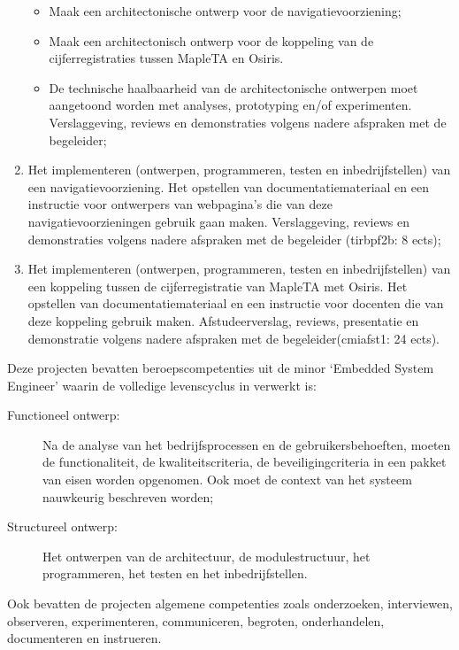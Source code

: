 \begin{enumerate}
\begin{itemize}
			\item Maak een architectonische ontwerp voor de navigatievoorziening;
			\item Maak een architectonisch ontwerp voor de koppeling van de cijferregistraties tussen MapleTA en Osiris.
			\item De technische haalbaarheid van de architectonische ontwerpen moet aangetoond worden met analyses, prototyping en/of experimenten. Verslaggeving, reviews en demonstraties volgens nadere afspraken met de begeleider;
		\end{itemize}
	\item Het implementeren (ontwerpen, programmeren, testen en inbedrijfstellen) van een navigatievoorziening. Het opstellen van documentatiemateriaal en een instructie voor ontwerpers van webpagina’s die van deze navigatievoorzieningen gebruik gaan maken. Verslaggeving, reviews en demonstraties volgens nadere afspraken met de begeleider (tirbpf2b: 8 ects);
	\item Het implementeren (ontwerpen, programmeren, testen en inbedrijfstellen) van een koppeling tussen de cijferregistratie van MapleTA met Osiris. Het opstellen van documentatiemateriaal en een instructie voor docenten die van deze koppeling gebruik maken. Afstudeerverslag, reviews, presentatie en demonstratie volgens nadere afspraken met de begeleider(cmiafst1: 24 ects).
\end{enumerate}

Deze projecten bevatten beroepscompetenties uit de minor ‘Embedded System Engineer’ waarin de volledige levenscyclus in verwerkt is:

\begin{description}
	\item[Functioneel ontwerp:] Na de analyse van het bedrijfsprocessen en de gebruikersbehoeften, moeten de functionaliteit, de kwaliteitscriteria, de beveiligingcriteria in een pakket van eisen worden opgenomen. Ook moet de context van het systeem nauwkeurig beschreven worden;
	\item[Structureel ontwerp:] Het ontwerpen van de architectuur, de modulestructuur, het programmeren, het testen en het inbedrijfstellen.
\end{description}

Ook bevatten de projecten algemene competenties zoals onderzoeken, interviewen, observeren, experimenteren, communiceren, begroten, onderhandelen, documenteren en instrueren.


